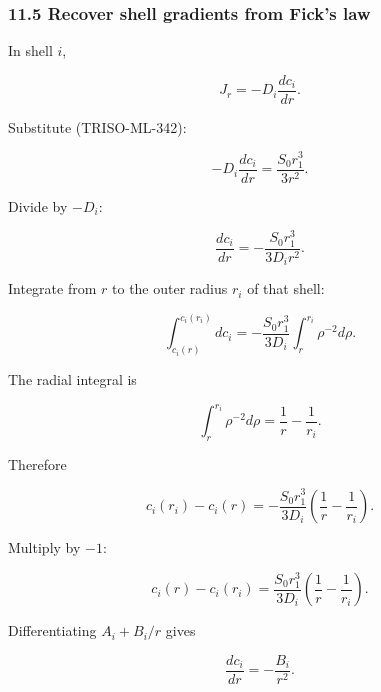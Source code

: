 \documentclass[11pt,a4paper]{article}
\begin{document}
\subsubsection*{11.5 Recover shell gradients from Fick's law}

In shell $i$,

\begin{equation}
J_r=-D_i\frac{dc_i}{dr}.
\tag{TRISO-ML-343}
\label{eq:triso-ml-343}
\end{equation}

Substitute (TRISO-ML-342):

\begin{equation}
-D_i\frac{dc_i}{dr}
=
\frac{S_0r_1^3}{3r^2}.
\tag{TRISO-ML-344}
\label{eq:triso-ml-344}
\end{equation}

Divide by $-D_i$:

\begin{equation}
\boxed{
\frac{dc_i}{dr}
=
-\frac{S_0r_1^3}{3D_ir^2}.
}
\tag{TRISO-ML-345}
\label{eq:triso-ml-345}
\end{equation}

Integrate from $r$ to the outer radius $r_i$ of that shell:

\begin{equation}
\int_{c_i(r)}^{c_i(r_i)}dc_i
=
-\frac{S_0r_1^3}{3D_i}
\int_r^{r_i}\rho^{-2}d\rho.
\tag{TRISO-ML-346}
\label{eq:triso-ml-346}
\end{equation}

The radial integral is

\begin{equation}
\int_r^{r_i}\rho^{-2}d\rho
=
\frac1r-\frac1{r_i}.
\tag{TRISO-ML-347}
\label{eq:triso-ml-347}
\end{equation}

Therefore

\begin{equation}
c_i(r_i)-c_i(r)
=
-\frac{S_0r_1^3}{3D_i}
\left(
\frac1r-\frac1{r_i}
\right).
\tag{TRISO-ML-348}
\label{eq:triso-ml-348}
\end{equation}

Multiply by $-1$:

\begin{equation}
\boxed{
c_i(r)-c_i(r_i)
=
\frac{S_0r_1^3}{3D_i}
\left(
\frac1r-\frac1{r_i}
\right).
}
\tag{TRISO-ML-349}
\label{eq:triso-ml-349}
\end{equation}

Differentiating $A_i+B_i/r$ gives

\begin{equation}
\frac{dc_i}{dr}=-\frac{B_i}{r^2}.
\tag{TRISO-ML-350}
\label{eq:triso-ml-350}
\end{equation}
\end{document}
